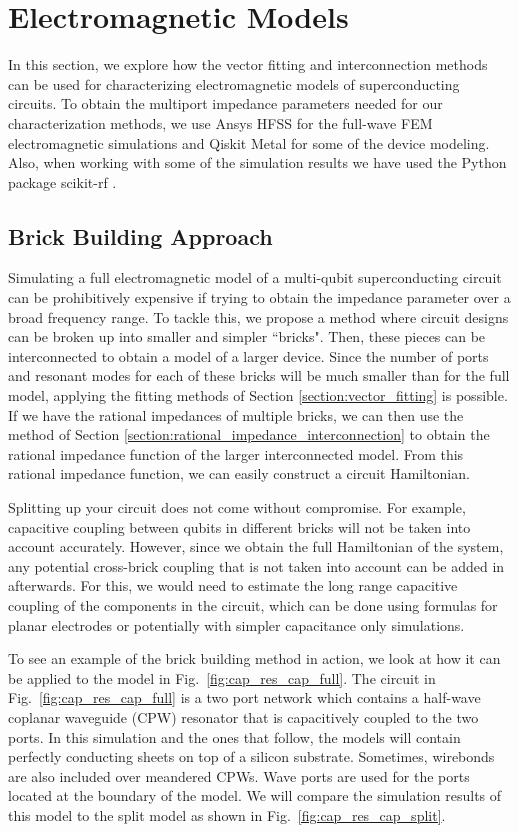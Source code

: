 \section{Electromagnetic Models}

In this section, we explore how the vector fitting and interconnection methods can be used for characterizing electromagnetic models of superconducting circuits. To obtain the multiport impedance parameters needed for our characterization methods, we use Ansys HFSS \cite{ansys_hfss} for the full-wave FEM electromagnetic simulations and Qiskit Metal \cite{Qiskit_Metal} for some of the device modeling. Also, when working with some of the simulation results we have used the Python package scikit-rf \cite{scikit_rf}.

\subsection{Brick Building Approach}

Simulating a full electromagnetic model of a multi-qubit superconducting circuit can be prohibitively expensive if trying to obtain the impedance parameter over a broad frequency range. To tackle this, we propose a method where circuit designs can be broken up into smaller and simpler ``bricks". Then, these pieces can be interconnected to obtain a model of a larger device. Since the number of ports and resonant modes for each of these bricks will be much smaller than for the full model, applying the fitting methods of Section \ref{section:vector_fitting} is possible. If we have the rational impedances of multiple bricks, we can then use the method of Section \ref{section:rational_impedance_interconnection} to obtain the rational impedance function of the larger interconnected model. From this rational impedance function, we can easily construct a circuit Hamiltonian.

Splitting up your circuit does not come without compromise. For example, capacitive coupling between qubits in different bricks will not be taken into account accurately. However, since we obtain the full Hamiltonian of the system, any potential cross-brick coupling that is not taken into account can be added in afterwards. For this, we would need to estimate the long range capacitive coupling of the components in the circuit, which can be done using formulas for planar electrodes \cite{planar_capacitance} or potentially with simpler capacitance only simulations.

To see an example of the brick building method in action, we look at how it can be applied to the model in Fig.\ \ref{fig:cap_res_cap_full}. The circuit in Fig.\ \ref{fig:cap_res_cap_full} is a two port network which contains a half-wave coplanar waveguide (CPW) resonator that is capacitively coupled to the two ports. In this simulation and the ones that follow, the models will contain perfectly conducting sheets on top of a silicon substrate. Sometimes, wirebonds are also included over meandered CPWs. Wave ports are used for the ports located at the boundary of the model. We will compare the simulation results of this model to the split model as shown in Fig.\ \ref{fig:cap_res_cap_split}.

